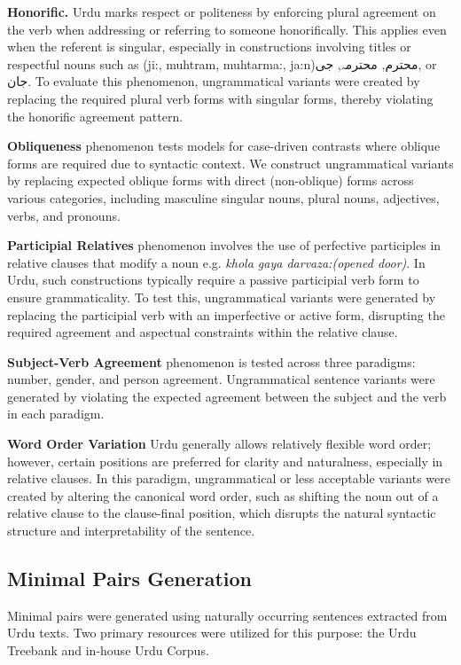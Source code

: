 \documentclass[11pt]{article}
\begin{document}
\textbf{Honorific.} Urdu marks respect or politeness by enforcing plural agreement on the verb when addressing or referring to someone honorifically. This applies even when the referent is singular, especially in constructions involving titles or respectful nouns such as (ji:, muhtram, muhtarma:, ja:n)\foreignlanguage{arabic}{محترم}, \foreignlanguage{arabic}{محترمہ}, \foreignlanguage{arabic}{جی}, or \foreignlanguage{arabic}{جان}. To evaluate this phenomenon, ungrammatical variants were created by replacing the required plural verb forms with singular forms, thereby violating the honorific agreement pattern. 

\textbf{Obliqueness} phenomenon tests 
models 
for 
case-driven contrasts where oblique forms are required due to syntactic context. We construct ungrammatical variants 
by replacing expected oblique forms with direct (non-oblique) forms across various categories, including masculine singular nouns, plural nouns, adjectives, verbs, and pronouns.


\textbf{Participial Relatives} phenomenon involves the use of perfective participles in relative clauses that modify a noun e.g. \textit{ khola gaya darvaza:(opened door)}. In Urdu, such constructions typically require a passive participial verb form to ensure grammaticality. To test this, ungrammatical variants were generated by replacing the participial verb with an imperfective or active form, disrupting the required agreement and aspectual constraints within the relative clause. 

\textbf{Subject-Verb Agreement} phenomenon is tested across three paradigms: number, gender, and person agreement. Ungrammatical sentence variants were generated by violating the expected agreement between the subject and the verb in each paradigm.




\textbf{Word Order Variation}
Urdu generally allows relatively flexible word order; however, certain positions are preferred for clarity and naturalness, especially in relative clauses. In this paradigm, ungrammatical  or less acceptable variants were created by altering the canonical word order, such as shifting the noun out of a relative clause to the clause-final position, which disrupts the natural syntactic structure and interpretability of the sentence.

\subsection{Minimal Pairs Generation}
 Minimal pairs were generated using naturally occurring sentences extracted from Urdu texts. Two primary resources were utilized for this purpose: the Urdu Treebank and in-house Urdu Corpus.
\end{document}
